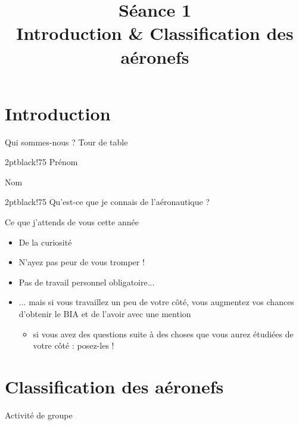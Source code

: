 

\title[Séance 1 - Introduction]{Séance 1 \\ Introduction \& Classification des aéronefs}


 \begin{frame}
 \titlepage
 \end{frame}
 
 \begin{frame}
 \tableofcontents
 \end{frame}
 
\section{Introduction}
\begin{frame}{Qui sommes-nous ? Tour de table}

\begin{awesomeblock}{2pt}{\faChild}{black!75}
Prénom

Nom
\end{awesomeblock}	

\begin{awesomeblock}{2pt}{\faPlane}{black!75}
Qu'est-ce que je connais de l'aéronautique ?
\end{awesomeblock}


\end{frame}

\begin{frame}{Ce que j'attends de vous cette année}
\begin{itemize}
  \item De la curiosité
  \item N'ayez pas peur de vous tromper !
  \item Pas de travail personnel obligatoire...
  \item ... mais si vous travaillez un peu de votre côté, vous augmentez vos chances d'obtenir le BIA et de l'avoir avec une mention
  \begin{itemize}
  	\item si vous avez des questions suite à des choses que vous aurez étudiées de votre côté : posez-les !
  \end{itemize}
\end{itemize}

\end{frame}


\section{Classification des aéronefs}
\begin{frame}{Activité de groupe}

\pause 
{}	
\end{frame}




